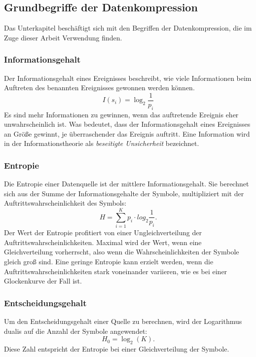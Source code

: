 \subsection{Grundbegriffe der Datenkompression}
\label{subsec:grundbegriffe_datenkompression}
Das Unterkapitel beschäftigt sich mit den Begriffen der Datenkompression, die im Zuge dieser Arbeit Verwendung finden.

\subsubsection*{Informationsgehalt}
Der Informationsgehalt eines Ereignisses beschreibt, wie viele Informationen beim Auftreten des benannten Ereignisses gewonnen werden können.
\begin{equation*}
I(s_i) = \log_2 \frac{1}{p_i}
\end{equation*}
Es sind mehr Informationen zu gewinnen, wenn das auftretende Ereignis eher unwahrscheinlich ist.
Was bedeutet, dass der Informationsgehalt eines Ereignisses an Größe gewinnt, je überraschender das Ereignis auftritt.
Eine Information wird in der Informationstheorie als \textit{beseitigte Unsicherheit} bezeichnet.

\subsubsection*{Entropie}
Die Entropie einer Datenquelle ist der mittlere Informationsgehalt.
Sie berechnet sich aus der Summe der Informationsgehalte der Symbole, multipliziert mit der Auftrittswahrscheinlichkeit des Symbols:
\begin{equation*}
H = \sum_{i = 1}^{K} p_i \cdot log_2 \frac{1}{p_i}.
\end{equation*}
Der Wert der Entropie profitiert von einer Ungleichverteilung der Auftrittswahrscheinlichkeiten.
Maximal wird der Wert, wenn eine Gleichverteilung vorherrscht, also wenn die Wahrscheinlichkeiten der Symbole gleich groß sind.
Eine geringe Entropie kann erzielt werden, wenn die Auftrittswahrscheinlichkeiten stark voneinander variieren, wie es bei einer Glockenkurve der Fall ist. 

\subsubsection*{Entscheidungsgehalt}
Um den Entscheidungsgehalt einer Quelle zu berechnen, wird der Logarithmus dualis auf die Anzahl der Symbole angewendet:
\begin{equation*}
H_0 = \log_2 (K).
\end{equation*}
Diese Zahl entspricht der Entropie bei einer Gleichverteilung der Symbole.

